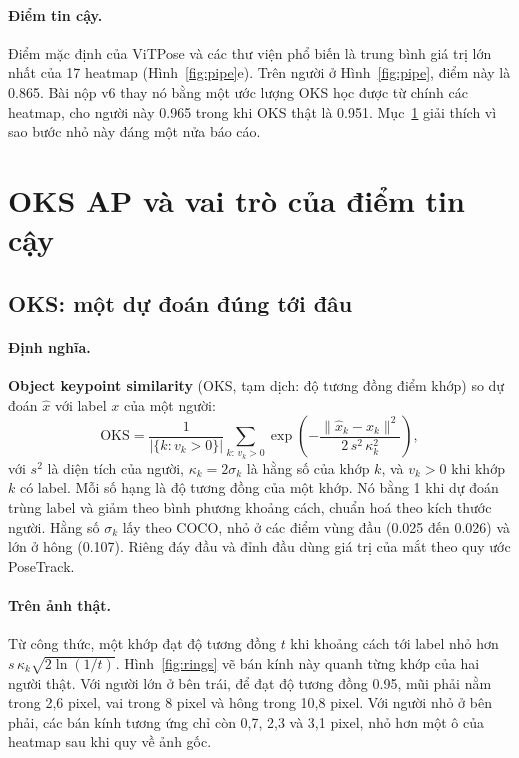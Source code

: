 \documentclass[11pt,a4paper]{article}
\newcommand{\OKS}{\mathrm{OKS}}
\begin{document}
\paragraph{Điểm tin cậy.} Điểm mặc định của ViTPose và các thư viện phổ biến là trung bình giá trị lớn nhất của 17 heatmap (Hình~\ref{fig:pipe}e). Trên người ở Hình~\ref{fig:pipe}, điểm này là 0.865. Bài nộp v6 thay nó bằng một ước lượng OKS học được từ chính các heatmap, cho người này 0.965 trong khi OKS thật là 0.951. Mục~\ref{sec:metric} giải thích vì sao bước nhỏ này đáng một nửa báo cáo.

\section{OKS AP và vai trò của điểm tin cậy}
\label{sec:metric}

\subsection{OKS: một dự đoán đúng tới đâu}

\paragraph{Định nghĩa.} \textbf{Object keypoint similarity} (OKS, tạm dịch: độ tương đồng điểm khớp) so dự đoán $\hat x$ với label $x$ của một người:
\begin{equation}
\OKS=\frac{1}{|\{k: v_k>0\}|}\sum_{k:\,v_k>0}\exp\!\left(-\frac{\|\hat x_k-x_k\|^2}{2\,s^2\,\kappa_k^2}\right),
\end{equation}
với $s^2$ là diện tích của người, $\kappa_k=2\sigma_k$ là hằng số của khớp $k$, và $v_k>0$ khi khớp $k$ có label. Mỗi số hạng là độ tương đồng của một khớp. Nó bằng 1 khi dự đoán trùng label và giảm theo bình phương khoảng cách, chuẩn hoá theo kích thước người. Hằng số $\sigma_k$ lấy theo COCO, nhỏ ở các điểm vùng đầu (0.025 đến 0.026) và lớn ở hông (0.107). Riêng đáy đầu và đỉnh đầu dùng giá trị của mắt theo quy ước PoseTrack.

\paragraph{Trên ảnh thật.} Từ công thức, một khớp đạt độ tương đồng $t$ khi khoảng cách tới label nhỏ hơn $s\,\kappa_k\sqrt{2\ln(1/t)}$. Hình~\ref{fig:rings} vẽ bán kính này quanh từng khớp của hai người thật. Với người lớn ở bên trái, để đạt độ tương đồng 0.95, mũi phải nằm trong 2,6 pixel, vai trong 8 pixel và hông trong 10,8 pixel. Với người nhỏ ở bên phải, các bán kính tương ứng chỉ còn 0,7, 2,3 và 3,1 pixel, nhỏ hơn một ô của heatmap sau khi quy về ảnh gốc.
\end{document}
